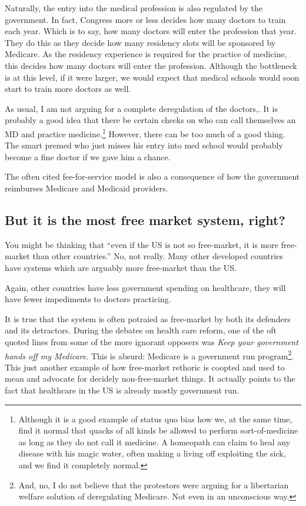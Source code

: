 Naturally, the entry into the medical profession is also regulated by the
government. In fact, Congress more or less decides how many doctors to train
each year. Which is to say, how many doctors will enter the profession that
year. They do this as they decide how many residency slots will be sponsored by
Medicare. As the residency experience is required for the practice of medicine,
this decides how many doctors will enter the profession. Although the
bottleneck is at this level, if it were larger, we would expect that medical
schools would soon start to train more doctors as well.

As usual, I am not arguing for a complete deregulation of the doctors,. It is
probably a good idea that there be certain checks on who can call themselves an
MD and practice medicine.\footnote{Although it is a good example of status quo
bias how we, at the same time, find it normal that quacks of all kinds be
allowed to perform sort-of-medicine as long as they do not call it medicine. A
homeopath can claim to heal any disease with his magic water, often making a
living off exploiting the sick, and we find it completely normal.} However,
there can be too much of a good thing. The smart premed who just misses his
entry into med school would probably become a fine doctor if we gave him a
chance.

The often cited fee-for-service model is also a consequence of how the
government reimburses Medicare and Medicaid providers.

\subsection{But it is the most free market system, right?}

You might be thinking that ``even if the US is not so free-market, it is more
free-market than other countries.'' No, not really. Many other developed
countries have systems which are arguably more free-market than the US.

Again, other countries have less government spending on healthcare, they will
have fewer impediments to doctors practicing.

It is true that the system is often potraied as free-market by both its
defenders and its detractors. During the debates on health care reform, one of
the oft quoted lines from some of the more ignorant opposers was \emph{Keep
your government hands off my Medicare}. This is absurd: Medicare is a
government run program\footnote{And, no, I do not believe that the protestors
were arguing for a libertarian welfare solution of deregulating Medicare. Not
even in an unconscious way.}. This just another example of how free-market
rethoric is coopted and used to mean and advocate for decidely non-free-market
things. It actually points to the fact that healthcare in the US is already
mostly government run.

